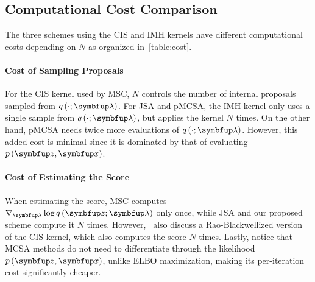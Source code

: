 \begin{wraptable}[11]{r}{0.55\textwidth}
  \vspace{-5ex}
  \centering
  
\end{wraptable}
%
\vspace{-1.5ex}
\subsection{Computational Cost Comparison}
\vspace{-1.5ex}
The three schemes using the CIS and IMH kernels have different computational costs depending on \(N\) as organized in~\cref{table:cost}.

\vspace{-1.5ex}
\paragraph{Cost of Sampling Proposals}
For the CIS kernel used by MSC, \(N\) controls the number of internal proposals sampled from \(q\,(\cdot; \vlambda)\).
For JSA and pMCSA, the IMH kernel only uses a single sample from \(q\,(\cdot; \vlambda)\), but applies the kernel \(N\) times.
On the other hand, pMCSA needs twice more evaluations of \(q\,(\cdot; \vlambda)\).
However, this added cost is minimal since it is dominated by that of evaluating \(p\,(\vz,\vx)\).

\vspace{-1.5ex}
\paragraph{Cost of Estimating the Score}
When estimating the score, MSC computes \(\nabla_{\vlambda} \log q\,(\vz; \vlambda)\) only once, while JSA and our proposed scheme compute it \(N\) times.
However,~\cite{NEURIPS2020_b2070693} also discuss a Rao-Blackwellized version of the CIS kernel, which also computes the score \(N\) times.
Lastly, notice that MCSA methods do not need to differentiate through the likelihood \(p\,(\vz,\vx)\), unlike ELBO maximization, making its per-iteration cost significantly cheaper.

